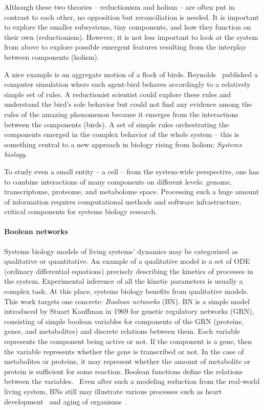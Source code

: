 \documentclass[
	digital, oneside, nosansbold, nocolorbold, nolot, nolof
]{fithesis4}
\theoremstyle{definition}
\theoremstyle{definition}
\begin{document}
Although these two theories -- reductionism and holism -- are often put in
contrast to each other, no opposition but reconciliation is needed. It is
important to explore the smaller subsystems, tiny components, and how they
function on their own (reductionism). However, it is not less important to look
at the system from above to explore possible emergent features resulting from
the interplay between components (holism).~\cite{systems_bio_hist}

A nice example is an aggregate motion of a flock of birds.
Reynolds~\cite{reynolds_flock} published a computer simulation where each
agent-bird behaves accordingly to a relatively simple set of rules. A
reductionist scientist could explore these rules and understand the bird's sole
behavior but could not find any evidence among the rules of the amazing
phenomenon because it emerges from the interactions between the components
(birds). A set of simple rules orchestrating the components emerged in the
complex behavior of the whole system -- this is something central to a new
approach in biology rising from holism: \emph{Systems biology}.

To study even a small entity -- a cell -- from the system-wide perspective, one
has to combine interactions of many components on different levels: genome,
transcriptome, proteome, and metabolome space. Processing such a huge amount of
information requires computational methods and software infrastructure,
critical components for systems biology research.~\cite{kitano_overview,
systems_bio_methods}

\paragraph{Boolean networks}

Systems biology models of living systems' dynamics may be categorized as
qualitative or quantitative. An example of a qualitative model is a set of ODE
(ordinary differential equations) precisely describing the kinetics of
processes in the system. Experimental inference of all the kinetic parameters
is usually a complex task. At this place, systems biology benefits from
qualitative models. This work targets one concrete: \emph{Boolean networks}
(BN). BN is a simple model introduced by Stuart Kauffman in 1969 for genetic
regulatory networks (GRN), consisting of simple boolean variables for
components of the GRN (proteins, genes, and metabolites) and discrete relations
between them.  Each variable represents the component being active or not. If
the component is a gene, then the variable represents whether the gene is
transcribed or not. In the case of metabolites or proteins, it may represent
whether the amount of metabolite or protein is sufficient for some reaction.
Boolean functions define the relations between the
variables.~\cite{concepts_bn} Even after such a modeling reduction from the
real-world living system, BNs still may illustrate various processes such as
heart development~\cite{heart_development} and aging of organisms~\cite{aging}.
\end{document}
